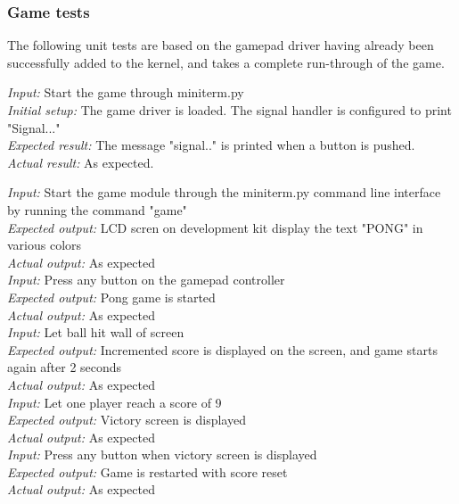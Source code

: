 \subsubsection{Game tests}

The following unit tests are based on the gamepad driver having already been successfully added to the kernel, and takes a complete run-through of the game.

\emph{Input: } Start the game through miniterm.py\\
\emph{Initial setup: } The game driver is loaded. The signal handler is configured to print "Signal..."\\
\emph{Expected result: } The message "signal.." is printed when a button is pushed. \\
\emph{Actual result: } As expected. 

\emph{Input: } Start the game module through the miniterm.py command line interface by running the command "game"\\
\emph{Expected output: } LCD scren on development kit display the text "PONG" in various colors\\
\emph{Actual output: } As expected \\

\emph{Input: } Press any button on the gamepad controller\\
\emph{Expected output: } Pong game is started\\
\emph{Actual output: } As expected \\

\emph{Input: } Let ball hit wall of screen\\
\emph{Expected output: } Incremented score is displayed on the screen, and game starts again after 2 seconds\\
\emph{Actual output: } As expected \\

\emph{Input: } Let one player reach a score of 9\\
\emph{Expected output: } Victory screen is displayed\\
\emph{Actual output: } As expected \\

\emph{Input: } Press any button when victory screen is displayed\\
\emph{Expected output: } Game is restarted with score reset\\
\emph{Actual output: } As expected \\